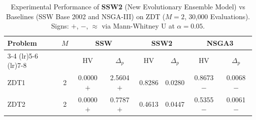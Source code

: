 \begin{table}[htbp]
\caption{Experimental Performance of \textbf{SSW2} (New Evolutionary Ensemble Model) vs Baselines (SSW Base 2002 and NSGA-III) on ZDT ($M=2$, 30,000 Evaluations). Signs: $+$, $-$, $\approx$ via Mann-Whitney U at $\alpha = 0.05$.}
\label{tab:ssw_results}
\centering\small
\begin{tabular}{@{}l c  c c c c c c@{}}
\toprule
\multirow{2}{*}{Problem} & \multirow{2}{*}{$M$} & \multicolumn{2}{c}{SSW} & \multicolumn{2}{c}{\textbf{SSW2}} & \multicolumn{2}{c}{NSGA3} \\
\cmidrule(lr){3-4} \cmidrule(lr){5-6} \cmidrule(lr){7-8}
& & HV & $\Delta_p$ & HV & $\Delta_p$ & HV & $\Delta_p$ \\
\midrule
ZDT1 & 2 & 0.0000 $+$ & 2.5604 $+$ & 0.8286 & 0.0280 & 0.8673 $-$ & 0.0068 $-$ \\
ZDT2 & 2 & 0.0000 $+$ & 0.7787 $+$ & 0.4613 & 0.0447 & 0.5355 $-$ & 0.0061 $-$ \\
\bottomrule
\end{tabular}
\end{table}
